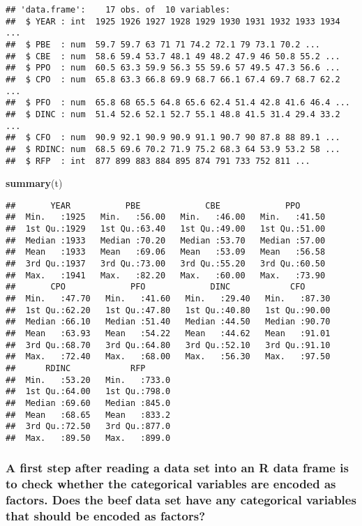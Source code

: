 \documentclass[]{article}
\newenvironment{Shaded}{\begin{snugshade}}{\end{snugshade}}
\newcommand{\KeywordTok}[1]{\textcolor[rgb]{0.13,0.29,0.53}{\textbf{#1}}}
\newcommand{\NormalTok}[1]{#1}
\begin{document}
\begin{verbatim}
## 'data.frame':    17 obs. of  10 variables:
##  $ YEAR : int  1925 1926 1927 1928 1929 1930 1931 1932 1933 1934 ...
##  $ PBE  : num  59.7 59.7 63 71 71 74.2 72.1 79 73.1 70.2 ...
##  $ CBE  : num  58.6 59.4 53.7 48.1 49 48.2 47.9 46 50.8 55.2 ...
##  $ PPO  : num  60.5 63.3 59.9 56.3 55 59.6 57 49.5 47.3 56.6 ...
##  $ CPO  : num  65.8 63.3 66.8 69.9 68.7 66.1 67.4 69.7 68.7 62.2 ...
##  $ PFO  : num  65.8 68 65.5 64.8 65.6 62.4 51.4 42.8 41.6 46.4 ...
##  $ DINC : num  51.4 52.6 52.1 52.7 55.1 48.8 41.5 31.4 29.4 33.2 ...
##  $ CFO  : num  90.9 92.1 90.9 90.9 91.1 90.7 90 87.8 88 89.1 ...
##  $ RDINC: num  68.5 69.6 70.2 71.9 75.2 68.3 64 53.9 53.2 58 ...
##  $ RFP  : int  877 899 883 884 895 874 791 733 752 811 ...
\end{verbatim}

\begin{Shaded}
\begin{Highlighting}[]
\KeywordTok{summary}\NormalTok{(t)}
\end{Highlighting}
\end{Shaded}

\begin{verbatim}
##       YEAR           PBE             CBE             PPO       
##  Min.   :1925   Min.   :56.00   Min.   :46.00   Min.   :41.50  
##  1st Qu.:1929   1st Qu.:63.40   1st Qu.:49.00   1st Qu.:51.00  
##  Median :1933   Median :70.20   Median :53.70   Median :57.00  
##  Mean   :1933   Mean   :69.06   Mean   :53.09   Mean   :56.58  
##  3rd Qu.:1937   3rd Qu.:73.00   3rd Qu.:55.20   3rd Qu.:60.50  
##  Max.   :1941   Max.   :82.20   Max.   :60.00   Max.   :73.90  
##       CPO             PFO             DINC            CFO       
##  Min.   :47.70   Min.   :41.60   Min.   :29.40   Min.   :87.30  
##  1st Qu.:62.20   1st Qu.:47.80   1st Qu.:40.80   1st Qu.:90.00  
##  Median :66.10   Median :51.40   Median :44.50   Median :90.70  
##  Mean   :63.93   Mean   :54.22   Mean   :44.62   Mean   :91.01  
##  3rd Qu.:68.70   3rd Qu.:64.80   3rd Qu.:52.10   3rd Qu.:91.10  
##  Max.   :72.40   Max.   :68.00   Max.   :56.30   Max.   :97.50  
##      RDINC            RFP       
##  Min.   :53.20   Min.   :733.0  
##  1st Qu.:64.00   1st Qu.:798.0  
##  Median :69.60   Median :845.0  
##  Mean   :68.65   Mean   :833.2  
##  3rd Qu.:72.50   3rd Qu.:877.0  
##  Max.   :89.50   Max.   :899.0
\end{verbatim}

\subsubsection{A first step after reading a data set into an R data
frame is to check whether the categorical variables are encoded as
factors. Does the beef data set have any categorical variables that
should be encoded as
factors?}\label{a-first-step-after-reading-a-data-set-into-an-r-data-frame-is-to-check-whether-the-categorical-variables-are-encoded-as-factors.-does-the-beef-data-set-have-any-categorical-variables-that-should-be-encoded-as-factors}
\end{document}
